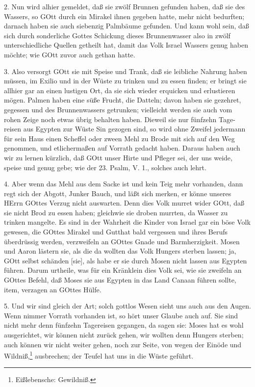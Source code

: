 2. Nun wird alhier gemeldet, daß sie zwölf Brunnen gefunden haben, daß sie des Wassers, so GOtt durch ein Mirakel ihnen gegeben hatte, mehr nicht bedurften; darnach haben sie auch siebenzig Palmbäume gefunden. Und kann wohl sein, daß sich durch sonderliche Gottes Schickung dieses Brunnenwasser also in zwölf unterschiedliche Quellen getheilt hat, damit das Volk Israel Wassers genug haben möchte; wie GOtt zuvor auch gethan hatte.

3. Also versorgt GOtt sie mit Speise und Trank, daß sie leibliche Nahrung haben müssen, im Exilio und in der Wüste zu trinken und zu essen finden; er bringt sie allhier gar an einen lustigen Ort, da sie sich wieder erquicken und erlustieren mögen. Palmen haben eine süße Frucht, die Datteln; davon haben sie gezehret, gegessen und des Brunnenwassers getrunken; vielleicht werden sie auch vom rohen Zeige noch etwas übrig behalten haben. Dieweil sie nur fünfzehn Tage-reisen aus Egypten zur Wüste Sin gezogen sind, so wird ohne Zweifel jedermann für sein Haus einen Scheffel oder zween Mehl zu Brode mit sich auf den Weg genommen, und etlichermaßen auf Vorrath gedacht haben. Daraus haben auch wir zu lernen kürzlich, daß GOtt unser Hirte und Pfleger sei, der uns weide, speise und genug gebe; wie der 23. Psalm, V. 1., solches auch lehrt.

4. Aber wenn das Mehl aus dem Sacke ist und kein Teig mehr vorhanden, dann regt sich der Abgott, Junker Bauch, und läßt sich merken, er könne unseres HErrn GOttes Verzug nicht auswarten. Denn dies Volk murret wider GOtt, daß sie nicht Brod zu essen haben; gleichwie sie droben murrten, da Wasser zu trinken mangelte. Es sind in der Wahrheit die Kinder von Israel gar ein böse Volk gewesen, die GOttes Mirakel und Gutthat bald vergessen und ihres Berufs überdrüssig werden, verzweifeln an GOttes Gnade und Barmherzigkeit. Mosen und Aaron lästern sie, als die da wollten das Volk Hungers sterben lassen; ja, GOtt selbst schänden [sie], als habe er sie durch Mosen nicht lassen aus Egypten führen. Darum urtheile, was für ein Kränklein dies Volk sei, wie sie zweifeln an GOttes Befehl, daß Moses sie aus Egypten in das Land Canaan führen sollte, item, verzagen an GOttes Hülfe.

5. Und wir sind gleich der Art; solch gottlos Wesen sieht uns auch aus den Augen. Wenn
nimmer Vorrath vorhanden ist, so hört unser Glaube auch auf. Sie sind nicht mehr denn fünfzehn Tagereisen gegangen, da sagen sie: Moses hat es wohl ausgerichtet, wir können nicht zurück gehen, wir wollten denn Hungers sterben; auch können wir nicht weiter gehen, noch zur Seite, von wegen der Einöde und Wildniß,\footnote{Eißlebensche: Gewildniß.} ausbrechen; der Teufel hat uns in die Wüste geführt.

